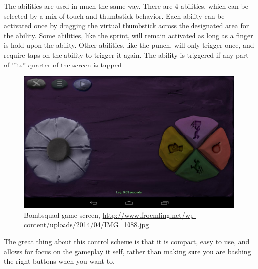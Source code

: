 The abilities are used in much the same way. 
There are 4 abilities, which can be selected by a mix of touch and thumbstick behavior. 
Each ability can be activated once by dragging the virtual thumbstick across the designated area for the ability. 
Some abilities, like the sprint, will remain activated as long as a finger is hold upon the ability. 
Other abilities, like the punch, will only trigger once, and require taps on the ability to trigger it again. 
The ability is triggered if any part of ''its'' quarter of the screen is tapped.

\begin{figure}[H]
\centering
\includegraphics[width=1\textwidth]{figures/controlscheme/onscreen_control}
\caption{Bombsquad game screen, \url{http://www.froemling.net/wp-content/uploads/2014/04/IMG_1088.jpg}}
\end{figure}

The great thing about this control scheme is that it is compact, easy to use, and allows for focus on the gameplay it self, rather than making sure you are bashing the right buttons when you want to.


